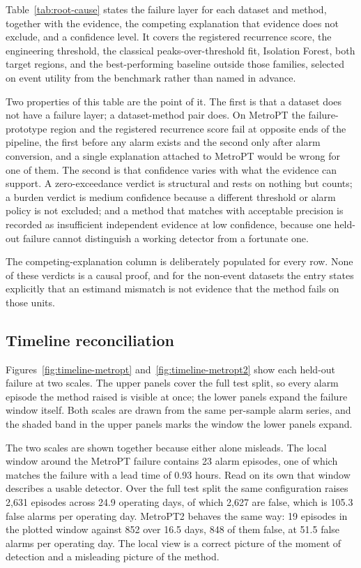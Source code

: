 Table~\ref{tab:root-cause} states the failure layer for each dataset and method, together with the evidence, the competing explanation that evidence does not exclude, and a confidence level. It covers the registered recurrence score, the engineering threshold, the classical peaks-over-threshold fit, Isolation Forest, both target regions, and the best-performing baseline outside those families, selected on event utility from the benchmark rather than named in advance.

Two properties of this table are the point of it. The first is that a dataset does not have a failure layer; a dataset-method pair does. On MetroPT the failure-prototype region and the registered recurrence score fail at opposite ends of the pipeline, the first before any alarm exists and the second only after alarm conversion, and a single explanation attached to MetroPT would be wrong for one of them. The second is that confidence varies with what the evidence can support. A zero-exceedance verdict is structural and rests on nothing but counts; a burden verdict is medium confidence because a different threshold or alarm policy is not excluded; and a method that matches with acceptable precision is recorded as insufficient independent evidence at low confidence, because one held-out failure cannot distinguish a working detector from a fortunate one.

The competing-explanation column is deliberately populated for every row. None of these verdicts is a causal proof, and for the non-event datasets the entry states explicitly that an estimand mismatch is not evidence that the method fails on those units.



\subsection{Timeline reconciliation}

Figures~\ref{fig:timeline-metropt} and~\ref{fig:timeline-metropt2} show each held-out failure at two scales. The upper panels cover the full test split, so every alarm episode the method raised is visible at once; the lower panels expand the failure window itself. Both scales are drawn from the same per-sample alarm series, and the shaded band in the upper panels marks the window the lower panels expand.

The two scales are shown together because either alone misleads. The local window around the MetroPT failure contains 23 alarm episodes, one of which matches the failure with a lead time of 0.93 hours. Read on its own that window describes a usable detector. Over the full test split the same configuration raises 2{,}631 episodes across 24.9 operating days, of which 2{,}627 are false, which is 105.3 false alarms per operating day. MetroPT2 behaves the same way: 19 episodes in the plotted window against 852 over 16.5 days, 848 of them false, at 51.5 false alarms per operating day. The local view is a correct picture of the moment of detection and a misleading picture of the method.

